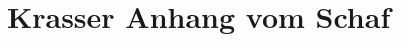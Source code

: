 \chapter{Krasser Anhang vom Schaf}
\label{ch:app:physics}


%

\cleardoublepage
\listoffigures

\cleardoublepage
\listoftables

\cleardoublepage
\printglossary[type=\acronymtype]

\cleardoublepage
% 
%
%
\printbibliography

\cleardoublepage

\thispagestyle{empty}

